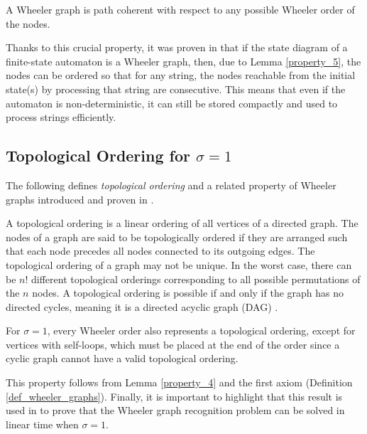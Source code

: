 \begin{lemma} \label{property_5}
    A Wheeler graph is path coherent with respect to any possible Wheeler order of the nodes.
\end{lemma}

Thanks to this crucial property, it was proven in \cite{wheelerGrpahs} that if the state diagram of a finite-state automaton is a Wheeler graph, then, due to Lemma \ref{property_5}, the nodes can be ordered so that for any string, the nodes reachable from the initial state(s) by processing that string are consecutive. This means that even if the automaton is non-deterministic, it can still be stored compactly and used to process strings efficiently.

\subsection{Topological Ordering for \texorpdfstring{$\sigma=1$}{Lg}}
The following defines \textit{topological ordering} and a related property of Wheeler graphs introduced and proven in \cite{inapproximabilityWheelerGraphs}.

\begin{definition}
    A topological ordering is a linear ordering of all vertices of a directed graph. The nodes of a graph are said to be topologically ordered if they are arranged such that each node precedes all nodes connected to its outgoing edges. The topological ordering of a graph may not be unique. In the worst case, there can be $n!$ different topological orderings corresponding to all possible permutations of the $n$ nodes. A topological ordering is possible if and only if the graph has no directed cycles, meaning it is a directed acyclic graph (DAG) \cite{topol16ogicalOrdering}.
\end{definition}

\begin{lemma} \label{property_6}
    For $\sigma=1$, every Wheeler order also represents a topological ordering, except for vertices with self-loops, which must be placed at the end of the order since a cyclic graph cannot have a valid topological ordering.
\end{lemma}

This property follows from Lemma \ref{property_4} and the first axiom (Definition \ref{def_wheeler_graphs}). Finally, it is important to highlight that this result is used in \cite{inapproximabilityWheelerGraphs} to prove that the Wheeler graph recognition problem can be solved in linear time when $\sigma=1$.

